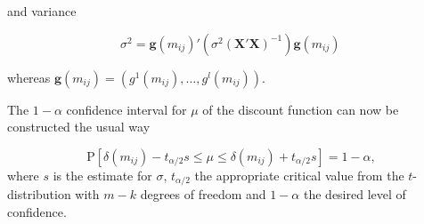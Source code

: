 and variance

\begin{equation*}
\sigma^2 = \bm{g}(m_{ij})'\left(\sigma^2(\bm{X' X})^{-1} \right)\bm{g}(m_{ij})\,
\end{equation*}

whereas $\bm{g}(m_{ij})= \left(g^1(m_{ij}), \dots, g^l(m_{ij}) \right)$.


 The $1- \alpha$ confidence interval for $\mu$ of the discount function can now be constructed the usual way

\begin{equation}
\label{eq:cint}
\mbox{P}\left[ \delta(m_{ij}) - t_{\alpha / 2} s   \leq \mu  \leq \delta(m_{ij})  + t_{\alpha / 2} s\right]= 1 - \alpha,
\end{equation} 
where $s$ is the estimate for $\sigma$, $t_{\alpha / 2}$ the appropriate critical value from the $t$-distribution with $m-k$ degrees of freedom and $1-\alpha$ the desired level of confidence. 















